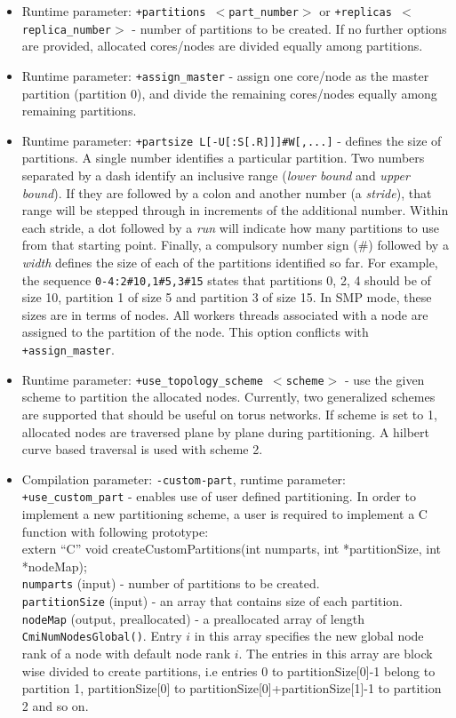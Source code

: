 \begin{itemize}
\item Runtime parameter: {\tt +partitions $<$part\_number$>$} or {\tt +replicas
$<$replica\_number$>$} - number of partitions to be created. If no further options are
provided, allocated cores/nodes are divided equally among partitions.

\item Runtime parameter: {\tt +assign\_master} - assign one core/node as the master 
partition (partition 0), and divide the remaining cores/nodes equally among remaining
partitions.

\item Runtime parameter: {\tt +partsize L[-U[:S[.R]]]\#W[,...]} - defines the size of 
partitions.  A single number identifies a particular partition. Two numbers separated by
a dash identify an inclusive range (\emph{lower bound} and \emph{upper bound}). If they 
are followed by a colon and another number (a \emph{stride}), that range will be stepped 
through in increments of the additional number. Within each stride, a dot followed by a
\emph{run} will indicate how many partitions to use from that starting point.  Finally, 
a compulsory number sign (\#) followed by a \emph{width} defines the size of each of the
partitions identified so far. For example, the sequence {\tt 0-4:2\#10,1\#5,3\#15} states that 
partitions 0, 2, 4 should be of size 10, partition 1 of size 5 and partition 3 of size 15. 
In SMP mode, these sizes are in terms of nodes. All workers threads associated with a node are
assigned to the partition of the node. This option conflicts with {\tt +assign\_master}.

\item Runtime parameter: {\tt +use\_topology\_scheme $<$scheme$>$} - use the given scheme
to partition the allocated nodes. Currently, two generalized schemes are supported that 
should be useful on torus networks. If scheme is set to 1, allocated nodes are traversed 
plane by plane during partitioning. A hilbert curve based traversal is used with scheme 2.

\item Compilation parameter: {\tt -custom-part}, runtime parameter: {\tt +use\_custom\_part} -
enables use of user defined partitioning. In order to implement a new partitioning scheme, 
a user is required to implement a C function with following prototype: \\ 

extern ``C'' void createCustomPartitions(int numparts, int *partitionSize, int *nodeMap);\\
{\tt numparts} (input) - number of partitions to be created. \\
{\tt partitionSize} (input) - an array that contains size of each partition. \\
{\tt nodeMap} (output, preallocated) - a preallocated array of length {\tt CmiNumNodesGlobal()}.
Entry $i$ in this array specifies the new global node rank of a node with default node rank $i$. 
The entries in this array are block wise divided to create partitions, i.e entries 0 to 
partitionSize[0]-1 belong to partition 1, partitionSize[0] to
partitionSize[0]+partitionSize[1]-1 to partition 2 and so on.\\


\end{itemize}
